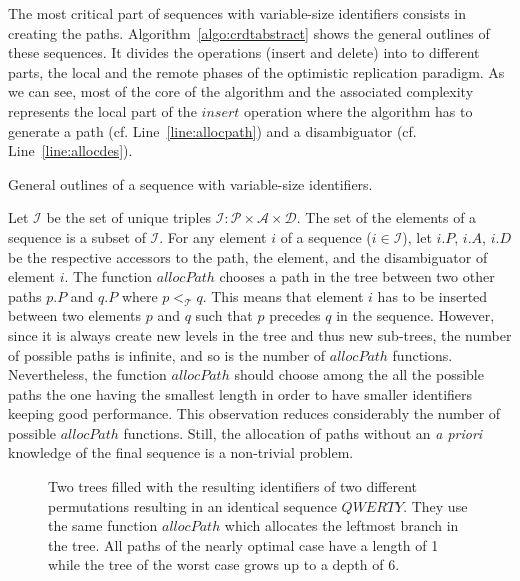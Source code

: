 The most critical part of sequences with variable-size identifiers consists in
creating the paths. Algorithm~\ref{algo:crdtabstract} shows the general
outlines of these sequences. It divides the operations (insert and delete) into
to different parts, the local and the remote phases of the optimistic
replication paradigm. As we can see, most of the core of the algorithm and the
associated complexity represents the local part of the $insert$ operation where
the algorithm has to generate a path (cf. Line~\ref{line:allocpath}) and a
disambiguator (cf. Line~\ref{line:allocdes}).

\begin{algorithm}
  
  \caption{\label{algo:crdtabstract}General outlines of a sequence with
    variable-size identifiers.}
\end{algorithm}

Let $\mathcal{I}$ be the set of unique triples
$\mathcal{I}: \mathcal{P}\times\mathcal{A}\times\mathcal{D}$. The set of the
elements of a sequence is a subset of $\mathcal{I}$. For any element $i$ of a
sequence ($i \in \mathcal{I}$), let $i.P$, $i.A$, $i.D$ be the respective
accessors to the path, the element, and the disambiguator of element $i$. The
function $allocPath$ chooses a path in the tree between two other paths $p.P$
and $q.P$ where $p<_{\mathcal{T}}q$. This means that element $i$ has to be
inserted between two elements $p$ and $q$ such that $p$ precedes $q$ in the
sequence. However, since it is always create new levels in the tree and thus
new sub-trees, the number of possible paths is infinite, and so is the number
of $allocPath$ functions. Nevertheless, the function $allocPath$ should choose
among the all the possible paths the one having the smallest length in order to
have smaller identifiers keeping good performance. This observation reduces
considerably the number of possible $allocPath$ functions. Still, the
allocation of paths without an \emph{a priori} knowledge of the final sequence
is a non-trivial problem.

\begin{figure*}
  \centering
  \hspace{50pt}
  \caption{\label{fig:allocpathexample} Two trees filled with the resulting
    identifiers of two different permutations resulting in an identical
    sequence $QWERTY$. They use the same function $allocPath$ which allocates
    the leftmost branch in the tree. All paths of the nearly optimal case have
    a length of 1 while the tree of the worst case grows up to a depth of 6.}
\end{figure*}

